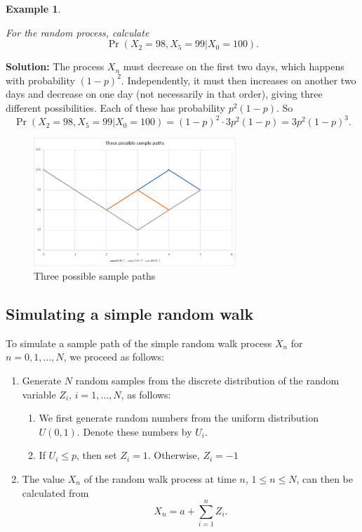 \documentclass[landscape, 20pt]{extreport}
\theoremstyle{definition}
\theoremstyle{definition}
\newtheorem{example}{Example}[chapter]
\theoremstyle{definition}
\theoremstyle{definition}
\theoremstyle{remark}
\begin{document}
\newpage \begin{example}
\protect\hypertarget{exm:unlabeled-div-65}{}\label{exm:unlabeled-div-65}

\emph{For the random process, calculate
\[\Pr(X_2 = 98, X_5 = 99 | X_0 = 100).\]}

\end{example}

\textbf{Solution:} The process \(X_n\) must decrease on the first two days,
which happens with probability \((1-p)^2\). Independently, it must then
increases on another two days and decrease on one day (not necessarily
in that order), giving three different possibilities. Each of these has
probability \(p^2(1-p)\). So
\[\Pr(X_2 = 98, X_5 = 99 | X_0 = 100) = (1-p)^2 \cdot 3 p^2(1-p) = 3p^2(1-p)^3.\]

\begin{figure}
\hypertarget{fig:SamplePaths}{%
\centering
\includegraphics[width=3in,height=\textheight]{RWThreePaths.pdf}
\caption{Three possible sample paths}\label{fig:SamplePaths}
}
\end{figure}

\hypertarget{simulating-a-simple-random-walk}{%
\subsection{Simulating a simple random walk}\label{simulating-a-simple-random-walk}}

To simulate a sample path of the simple random walk process \(X_n\) for
\(n = 0,1, \ldots, N\), we proceed as follows:

\begin{enumerate}
\def\labelenumi{\arabic{enumi}.}
\item
  Generate \(N\) random samples from the discrete distribution of the
  random variable \(Z_i\), \(i = 1,\ldots, N\), as follows:

  \begin{enumerate}
  \def\labelenumii{\arabic{enumii}.}
  \item
    We first generate random numbers from the uniform distribution
    \(U(0,1)\). Denote these numbers by \(U_i\).
  \item
    If \(U_i \le p\), then set \(Z_i = 1\). Otherwise, \(Z_i = -1\)
  \end{enumerate}
\item
  The value \(X_n\) of the random walk process at time \(n\),
  \(1 \le n \le N\), can then be calculated from
  \[X_n = a + \sum_{i=1}^n  Z_i.\]
\end{enumerate}
\end{document}
